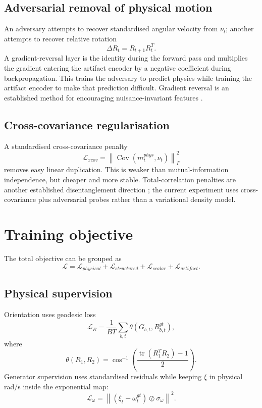 \documentclass[11pt,a4paper]{article}
\begin{document}
\subsection{Adversarial removal of physical motion}
An adversary attempts to recover standardised angular velocity from $\nu_t$; another attempts to recover relative rotation
\begin{equation}
\Delta R_t=R_{t+1}R_t^T.
\end{equation}
A gradient-reversal layer is the identity during the forward pass and multiplies the gradient entering the artifact encoder by a negative coefficient during backpropagation. This trains the adversary to predict physics while training the artifact encoder to make that prediction difficult. Gradient reversal is an established method for encouraging nuisance-invariant features \citep{ganin2016dann}.

\subsection{Cross-covariance regularisation}
A standardised cross-covariance penalty
\begin{equation}
\mathcal L_{xcov}=\left\|\operatorname{Cov}(m_t^{phys},\nu_t)\right\|_F^2
\end{equation}
removes easy linear duplication. This is weaker than mutual-information independence, but cheaper and more stable. Total-correlation penalties are another established disentanglement direction \citep{chen2018tcvae}; the current experiment uses cross-covariance plus adversarial probes rather than a variational density model.

\section{Training objective}
The total objective can be grouped as
\begin{equation}
\mathcal L=\mathcal L_{physical}+\mathcal L_{structured}+\mathcal L_{scalar}+\mathcal L_{artifact}.
\end{equation}

\subsection{Physical supervision}
Orientation uses geodesic loss
\begin{equation}
\mathcal L_R=\frac1{BT}\sum_{b,t}\theta(G_{b,t},R_{b,t}^{gt}),
\end{equation}
where
\begin{equation}
\theta(R_1,R_2)=\cos^{-1}\left(\frac{\operatorname{tr}(R_1^TR_2)-1}{2}\right).
\end{equation}
Generator supervision uses standardised residuals while keeping $\xi$ in physical rad/s inside the exponential map:
\begin{equation}
\mathcal L_\omega=\left\|(\xi_t-\omega_t^{gt})\oslash\sigma_\omega\right\|^2.
\end{equation}
\end{document}
